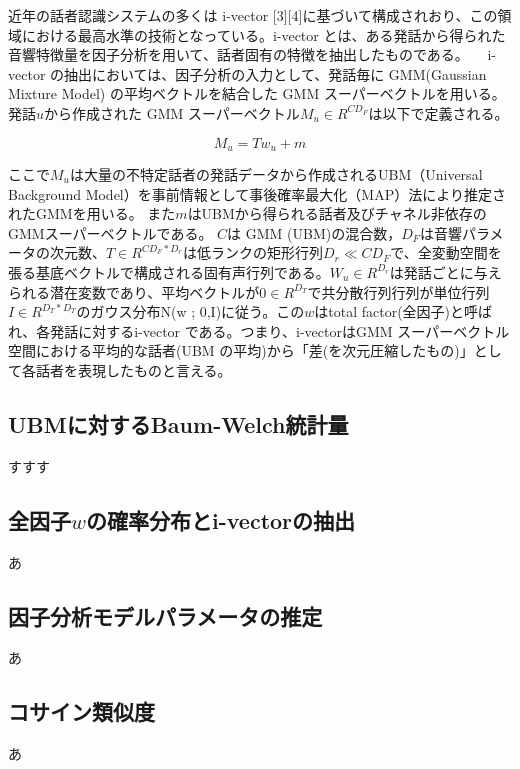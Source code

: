 近年の話者認識システムの多くは i-vector [3][4]に基づいて構成されおり、この領域における最高水準の技術となっている。i-vector とは、ある発話から得られた音響特徴量を因子分析を用いて、話者固有の特徴を抽出したものである。
　i-vector の抽出においては、因子分析の入力として、発話毎に GMM(Gaussian Mixture Model) の平均ベクトルを結合した GMM スーパーベクトルを用いる。発話$u$から作成された GMM スーパーベクトル$M_u∈R^{CD_F}$は以下で定義される。

\begin{equation}
M_u=T w_u + m
\end{equation}

ここで$M_u$は大量の不特定話者の発話データから作成されるUBM（Universal Background Model）を事前情報として事後確率最大化（MAP）法により推定されたGMMを用いる。
また$m$はUBMから得られる話者及びチャネル非依存のGMMスーパーベクトルである。
$C$は GMM (UBM)の混合数，$D_F$は音響パラメータの次元数、$T∈R^{CD_F*D_r}$は低ランクの矩形行列$D_r \ll CD_F$で、全変動空間を張る基底ベクトルで構成される固有声行列である。$W_u \in R^{D_r}$は発話ごとに与えられる潜在変数であり、平均ベクトルが$0 \in R^{D_T}$で共分散行列行列が単位行列$I \in R^{D_T*D_T}$のガウス分布N(w ; 0,I)に従う。この$w$はtotal factor(全因子)と呼ばれ、各発話に対するi-vector である。つまり、i-vectorはGMM スーパーベクトル空間における平均的な話者(UBM の平均)から「差(を次元圧縮したもの)」として各話者を表現したものと言える。

\subsection{UBMに対するBaum-Welch統計量}
すすす
\subsection{全因子$w$の確率分布とi-vectorの抽出}
あ
\subsection{因子分析モデルパラメータの推定}
あ
\subsection{コサイン類似度}
あ
